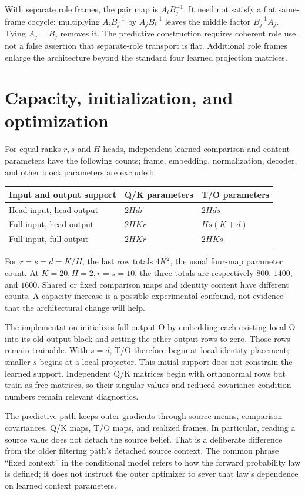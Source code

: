 \documentclass[11pt,letterpaper]{article}
\begin{document}
With separate role frames, the pair map is $A_iB_j^{-1}$. It need not satisfy a flat same-frame cocycle: multiplying $A_iB_j^{-1}$ by $A_jB_k^{-1}$ leaves the middle factor $B_j^{-1}A_j$. Tying $A_j=B_j$ removes it. The predictive construction requires coherent role use, not a false assertion that separate-role transport is flat. Additional role frames enlarge the architecture beyond the standard four learned projection matrices.

\section{Capacity, initialization, and optimization}
For equal ranks $r,s$ and $H$ heads, independent learned comparison and content parameters have the following counts; frame, embedding, normalization, decoder, and other block parameters are excluded:
\begin{center}
\begin{tabular}{lll}
\toprule
Input and output support & Q/K parameters & T/O parameters\\
\midrule
Head input, head output & $2Hdr$ & $2Hds$\\
Full input, head output & $2HKr$ & $Hs(K+d)$\\
Full input, full output & $2HKr$ & $2HKs$\\
\bottomrule
\end{tabular}
\end{center}
For $r=s=d=K/H$, the last row totals $4K^2$, the usual four-map parameter count. At $K=20,H=2,r=s=10$, the three totals are respectively $800$, $1400$, and $1600$. Shared or fixed comparison maps and identity content have different counts. A capacity increase is a possible experimental confound, not evidence that the architectural change will help.

The implementation initializes full-output O by embedding each existing local O into its old output block and setting the other output rows to zero. Those rows remain trainable. With $s=d$, T/O therefore begin at local identity placement; smaller $s$ begins at a local projector. This initial support does not constrain the learned support. Independent Q/K matrices begin with orthonormal rows but train as free matrices, so their singular values and reduced-covariance condition numbers remain relevant diagnostics.

The predictive path keeps outer gradients through source means, comparison covariances, Q/K maps, T/O maps, and realized frames. In particular, reading a source value does not detach the source belief. That is a deliberate difference from the older filtering path's detached source context. The common phrase ``fixed context'' in the conditional model refers to how the forward probability law is defined; it does not instruct the outer optimizer to sever that law's dependence on learned context parameters.
\end{document}
